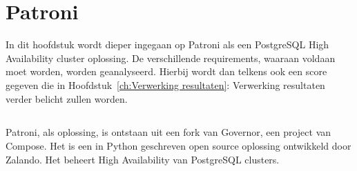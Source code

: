 \chapter{Patroni}
\label{ch:Patroni}

In dit hoofdstuk wordt dieper ingegaan op Patroni als een PostgreSQL High Availability cluster oplossing. De verschillende requirements, waaraan voldaan moet worden, worden geanalyseerd. Hierbij wordt dan telkens ook een score gegeven die in Hoofdstuk~\ref{ch:Verwerking resultaten}: Verwerking resultaten verder belicht zullen worden.

\section{}
\label{sec:Inleiding tot Patroni}

Patroni, als oplossing, is ontstaan uit een fork van Governor, een project van Compose. Het is een in Python geschreven open source oplossing ontwikkeld door Zalando. Het beheert High Availability van PostgreSQL clusters.

\section{}
\label{sec:Requirements}

\subsection{}
\label{subsec:Must have}

\subsubsection{}
\label{subsubsec:Replicatie}

